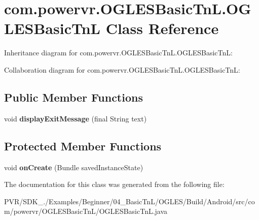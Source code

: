 \hypertarget{classcom_1_1powervr_1_1_o_g_l_e_s_basic_tn_l_1_1_o_g_l_e_s_basic_tn_l}{\section{com.\+powervr.\+O\+G\+L\+E\+S\+Basic\+Tn\+L.\+O\+G\+L\+E\+S\+Basic\+Tn\+L Class Reference}
\label{classcom_1_1powervr_1_1_o_g_l_e_s_basic_tn_l_1_1_o_g_l_e_s_basic_tn_l}
}


Inheritance diagram for com.\+powervr.\+O\+G\+L\+E\+S\+Basic\+Tn\+L.\+O\+G\+L\+E\+S\+Basic\+Tn\+L\+:


Collaboration diagram for com.\+powervr.\+O\+G\+L\+E\+S\+Basic\+Tn\+L.\+O\+G\+L\+E\+S\+Basic\+Tn\+L\+:
\subsection*{Public Member Functions}
\begin{DoxyCompactItemize}
\item 
\hypertarget{classcom_1_1powervr_1_1_o_g_l_e_s_basic_tn_l_1_1_o_g_l_e_s_basic_tn_l_adf2f5268dd24e090620459efecabb473}{void {\bfseries display\+Exit\+Message} (final String text)}\label{classcom_1_1powervr_1_1_o_g_l_e_s_basic_tn_l_1_1_o_g_l_e_s_basic_tn_l_adf2f5268dd24e090620459efecabb473}

\end{DoxyCompactItemize}
\subsection*{Protected Member Functions}
\begin{DoxyCompactItemize}
\item 
\hypertarget{classcom_1_1powervr_1_1_o_g_l_e_s_basic_tn_l_1_1_o_g_l_e_s_basic_tn_l_aa1e3efc49bd363f05fde28fa747b7cee}{void {\bfseries on\+Create} (Bundle saved\+Instance\+State)}\label{classcom_1_1powervr_1_1_o_g_l_e_s_basic_tn_l_1_1_o_g_l_e_s_basic_tn_l_aa1e3efc49bd363f05fde28fa747b7cee}

\end{DoxyCompactItemize}


The documentation for this class was generated from the following file\+:\begin{DoxyCompactItemize}
\item 
P\+V\+R/\+S\+D\+K\+\_./\+Examples/\+Beginner/04\+\_\+\+Basic\+Tn\+L/\+O\+G\+L\+E\+S/\+Build/\+Android/src/com/powervr/\+O\+G\+L\+E\+S\+Basic\+Tn\+L/O\+G\+L\+E\+S\+Basic\+Tn\+L.\+java\end{DoxyCompactItemize}
